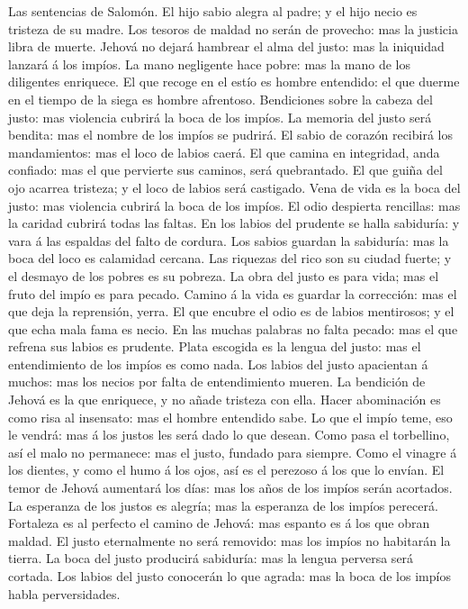  Las sentencias de Salomón. El hijo sabio alegra al padre;
y el hijo necio es tristeza de su madre.  Los tesoros de
maldad no serán de provecho: mas la justicia libra de muerte.
 Jehová no dejará hambrear el alma del justo: mas la
iniquidad lanzará á los impíos.  La mano negligente hace
pobre: mas la mano de los diligentes enriquece.  El que
recoge en el estío es hombre entendido: el que duerme en el tiempo de la
siega es hombre afrentoso.  Bendiciones sobre la cabeza
del justo: mas violencia cubrirá la boca de los impíos. 
La memoria del justo será bendita: mas el nombre de los impíos se
pudrirá.  El sabio de corazón recibirá los mandamientos:
mas el loco de labios caerá.  El que camina en integridad,
anda confiado: mas el que pervierte sus caminos, será quebrantado.
 El que guiña del ojo acarrea tristeza; y el loco de
labios será castigado.  Vena de vida es la boca del
justo: mas violencia cubrirá la boca de los impíos.  El
odio despierta rencillas: mas la caridad cubrirá todas las faltas.
 En los labios del prudente se halla sabiduría: y vara á
las espaldas del falto de cordura.  Los sabios guardan la
sabiduría: mas la boca del loco es calamidad cercana. 
Las riquezas del rico son su ciudad fuerte; y el desmayo de los pobres
es su pobreza.  La obra del justo es para vida; mas el
fruto del impío es para pecado.  Camino á la vida es
guardar la corrección: mas el que deja la reprensión, yerra.
 El que encubre el odio es de labios mentirosos; y el que
echa mala fama es necio.  En las muchas palabras no falta
pecado: mas el que refrena sus labios es prudente.  Plata
escogida es la lengua del justo: mas el entendimiento de los impíos es
como nada.  Los labios del justo apacientan á muchos: mas
los necios por falta de entendimiento mueren.  La
bendición de Jehová es la que enriquece, y no añade tristeza con ella.
 Hacer abominación es como risa al insensato: mas el
hombre entendido sabe.  Lo que el impío teme, eso le
vendrá: mas á los justos les será dado lo que desean. 
Como pasa el torbellino, así el malo no permanece: mas el justo, fundado
para siempre.  Como el vinagre á los dientes, y como el
humo á los ojos, así es el perezoso á los que lo envían. 
El temor de Jehová aumentará los días: mas los años de los impíos serán
acortados.  La esperanza de los justos es alegría; mas la
esperanza de los impíos perecerá.  Fortaleza es al
perfecto el camino de Jehová: mas espanto es á los que obran maldad.
 El justo eternalmente no será removido: mas los impíos
no habitarán la tierra.  La boca del justo producirá
sabiduría: mas la lengua perversa será cortada.  Los
labios del justo conocerán lo que agrada: mas la boca de los impíos
habla perversidades.


